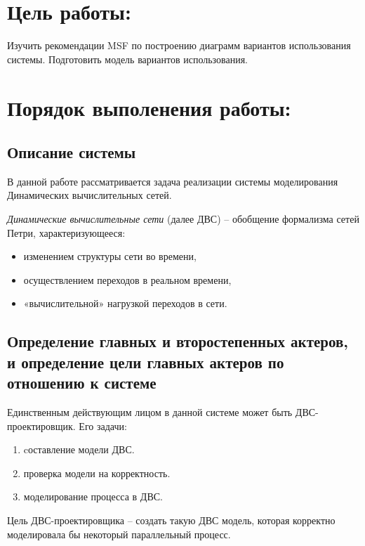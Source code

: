 	\section{Цель работы:}
		Изучить рекомендации MSF по построению диаграмм вариантов использования системы. Подготовить модель вариантов использования.
	\section{Порядок выполенения работы:}
		\subsection{Описание системы}
			В данной работе рассматривается задача реализации системы моделирования Динамических вычислительных сетей.
			
			\textit{Динамические вычислительные сети} (далее ДВС) -- обобщение формализма сетей Петри, характеризующееся:
			\begin{itemize}
				\item изменением структуры сети во времени,
				\item осуществлением переходов в реальном времени,
				\item «вычислительной» нагрузкой переходов в сети.
			\end{itemize}

		\subsection{Определение главных и второстепенных актеров, и определение цели главных актеров по отношению к системе}
			Единственным действующим лицом в данной системе может быть ДВС-проектировщик. Его задачи:
			\begin{enumerate}
				\item cоставление модели ДВС.
				\item проверка модели на корректность.
				\item моделирование процесса в ДВС. 
			\end{enumerate}
			
			Цель ДВС-проектировщика -- создать такую ДВС модель, которая корректно моделировала бы некоторый параллельный процесс.
